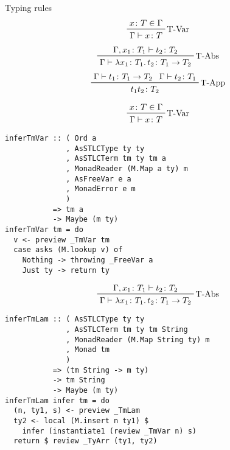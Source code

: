 \documentclass[aspectration=169]{beamer}
\begin{document}
\begin{frame}
  Typing rules
  \begin{displaymath}  
    \prftree[r]{T-Var}
    {x \colon T \in \Gamma}
    {\Gamma \vdash x \colon T}
  \end{displaymath}  
  \begin{displaymath}  
    \prftree[r]{T-Abs}
    {\Gamma, x_1 \colon T_1 \vdash t_2 \colon T_2}
    {\Gamma \vdash \lambda x_1 \colon T_1 \ldotp t_2 \colon T_1 \rightarrow T_2}
  \end{displaymath}  
  \begin{displaymath}  
    \prftree[r]{T-App}
    {\Gamma \vdash t_1 \colon T_1 \rightarrow T_2}
    {\Gamma \vdash t_2 \colon T_1}
    {t_1 t_2 \colon T_2}
  \end{displaymath}  
\end{frame}

\begin{frame}[fragile]
  \begin{displaymath}  
    \prftree[r]{T-Var}
    {x \colon T \in \Gamma}
    {\Gamma \vdash x \colon T}
  \end{displaymath}  
  \begin{verbatim}
inferTmVar :: ( Ord a
              , AsSTLCType ty ty
              , AsSTLCTerm tm ty tm a
              , MonadReader (M.Map a ty) m
              , AsFreeVar e a
              , MonadError e m
              )
           => tm a
           -> Maybe (m ty)
inferTmVar tm = do
  v <- preview _TmVar tm
  case asks (M.lookup v) of
    Nothing -> throwing _FreeVar a 
    Just ty -> return ty
  \end{verbatim}  
\end{frame}

\begin{frame}[fragile]
  \begin{displaymath}  
    \prftree[r]{T-Abs}
    {\Gamma, x_1 \colon T_1 \vdash t_2 \colon T_2}
    {\Gamma \vdash \lambda x_1 \colon T_1 \ldotp t_2 \colon T_1 \rightarrow T_2}
  \end{displaymath}  
  \begin{verbatim}
inferTmLam :: ( AsSTLCType ty ty
              , AsSTLCTerm tm ty tm String
              , MonadReader (M.Map String ty) m
              , Monad tm
              )
           => (tm String -> m ty)
           -> tm String
           -> Maybe (m ty)
inferTmLam infer tm = do
  (n, ty1, s) <- preview _TmLam
  ty2 <- local (M.insert n ty1) $
    infer (instantiate1 (review _TmVar n) s)
  return $ review _TyArr (ty1, ty2)
  \end{verbatim}  
\end{frame}
\end{document}
